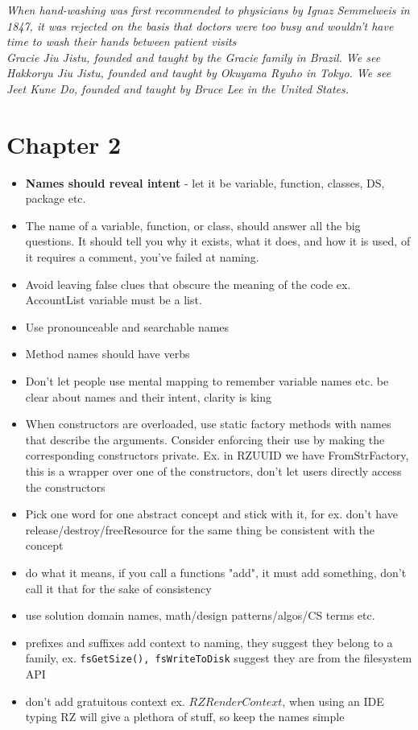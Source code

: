 \documentclass[14pt]{article}
\begin{document}
	\textit{When hand-washing was first recommended to physicians by Ignaz Semmelweis in 1847, it was rejected on the basis that doctors were too busy and wouldn’t have time to wash their hands between patient visits} \\
	
	\textit{Gracie Jiu Jistu, founded and taught by the Gracie family in Brazil. We see Hakkoryu Jiu Jistu, founded and taught by Okuyama Ryuho in Tokyo. We see Jeet Kune Do, founded and taught by Bruce Lee in the United States.} \\

\section*{Chapter 2}
\begin{itemize}

	\item \textbf{Names should reveal intent} - let it be variable, function, classes, DS, package etc.
	\item The name of a variable, function, or class, should answer all the big questions. It should tell you why it exists, what it does, and how it is used, of it requires a comment, you've failed at naming.
	\item Avoid leaving false clues that obscure the meaning of the code ex. AccountList variable must be a list.
	\item Use pronounceable and searchable names
	\item Method names should have verbs
	\item Don't let people use mental mapping to remember variable names etc. be clear about names and their intent, clarity is king
	\item When constructors are overloaded, use static factory methods with names that
describe the arguments. Consider enforcing their use by making the corresponding constructors private. Ex. in RZUUID we have FromStrFactory, this is a wrapper over one of the constructors, don't let users directly access the constructors
	\item Pick one word for one abstract concept and stick with it, for ex. don't have release/destroy/freeResource for the same thing be consistent with the concept
	\item do what it means, if you call a functions "add", it must add something, don't call it that for the sake of consistency
	\item use solution domain names, math/design patterns/algos/CS terms etc.
	\item prefixes and suffixes add context to naming, they suggest they belong to a family, ex. \lstinline|fsGetSize(), fsWriteToDisk| suggest they are from the filesystem API
	\item don't add gratuitous context ex. $RZRenderContext$, when using an IDE typing RZ will give a plethora of stuff, so keep the names simple
	 
\end{itemize}
\end{document}
